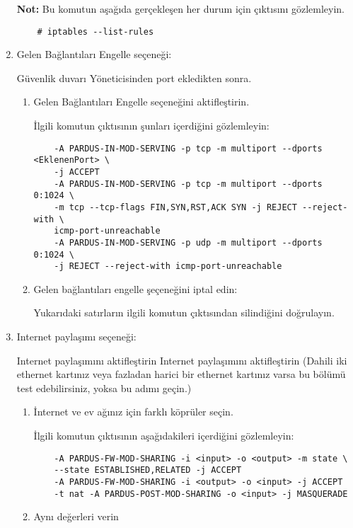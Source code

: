 \documentclass[a4paper,10pt]{article}
\begin{document}
\begin{enumerate}
\textbf{Not:} Bu komutun aşağıda gerçekleşen her durum için çıktısını gözlemleyin.

\begin{verbatim}
    # iptables --list-rules
\end{verbatim} 

\item Gelen Bağlantıları Engelle seçeneği:

 Güvenlik duvarı Yöneticisinden port ekledikten sonra.
\begin{enumerate}
  
        \item Gelen Bağlantıları Engelle seçeneğini aktifleştirin.
        
	İlgili komutun çıktısının şunları içerdiğini gözlemleyin:
	\begin{verbatim}
	-A PARDUS-IN-MOD-SERVING -p tcp -m multiport --dports <EklenenPort> \
	-j ACCEPT
	-A PARDUS-IN-MOD-SERVING -p tcp -m multiport --dports 0:1024 \
	-m tcp --tcp-flags FIN,SYN,RST,ACK SYN -j REJECT --reject-with \
	icmp-port-unreachable
	-A PARDUS-IN-MOD-SERVING -p udp -m multiport --dports 0:1024 \
	-j REJECT --reject-with icmp-port-unreachable
	\end{verbatim} 
        \item Gelen bağlantıları engelle şeçeneğini iptal edin:

              Yukarıdaki satırların ilgili komutun çıktısından silindiğini doğrulayın.
\end{enumerate}

\newpage

\item Internet paylaşımı seçeneği:

Internet paylaşımını aktifleştirin
    Internet paylaşımını aktifleştirin
    	(Dahili iki ethernet kartınız veya fazladan harici bir ethernet kartınız varsa bu bölümü test edebilirsiniz, yoksa bu adımı geçin.)
        \begin{enumerate}

        \item İnternet ve ev ağınız için farklı köprüler seçin.
  
         İlgili komutun çıktısının aşağıdakileri içerdiğini gözlemleyin:
	\begin{verbatim}
	-A PARDUS-FW-MOD-SHARING -i <input> -o <output> -m state \
	--state ESTABLISHED,RELATED -j ACCEPT
	-A PARDUS-FW-MOD-SHARING -i <output> -o <input> -j ACCEPT
	-t nat -A PARDUS-POST-MOD-SHARING -o <input> -j MASQUERADE
	\end{verbatim} 
        \item Aynı değerleri verin


\end{enumerate}
\end{enumerate}
\end{document}
